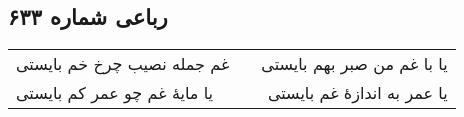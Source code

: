 \begin{center}
\section*{رباعی شماره ۶۳۳}
\label{sec:sh633}
\begin{longtable}{l p{0.5cm} r}
غم جمله نصیب چرخ خم بایستی
&&
یا با غم من صبر بهم بایستی
\\
یا مایهٔ غم چو عمر کم بایستی
&&
یا عمر به اندازهٔ غم بایستی
\\
\end{longtable}
\end{center}
